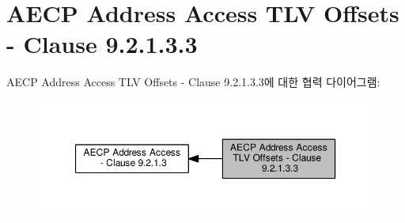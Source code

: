 \hypertarget{group___a_e_c_p___a_a__tlv}{}\section{A\+E\+CP Address Access T\+LV Offsets -\/ Clause 9.2.1.3.3}
\label{group___a_e_c_p___a_a__tlv}
A\+E\+CP Address Access T\+LV Offsets -\/ Clause 9.2.1.3.3에 대한 협력 다이어그램\+:
\nopagebreak
\begin{figure}[H]
\begin{center}
\leavevmode
\includegraphics[width=350pt]{group___a_e_c_p___a_a__tlv}
\end{center}
\end{figure}
